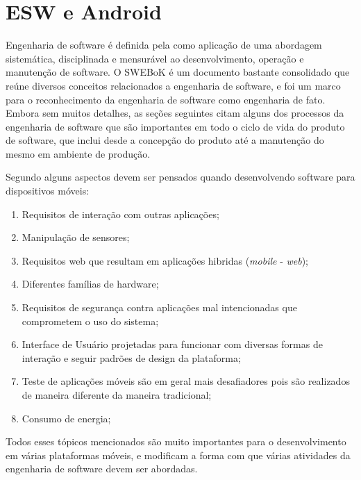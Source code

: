\chapter{ESW e Android}
\label{cap:eswandroid}

Engenharia de software é definida pela \cite{swebok} como aplicação de uma abordagem sistemática, disciplinada e mensurável ao desenvolvimento, operação e manutenção de software. O SWEBoK é um documento bastante consolidado que reúne diversos conceitos relacionados a engenharia de software, e foi um marco para o reconhecimento da engenharia de software como engenharia de fato. Embora sem muitos detalhes, as seções seguintes citam alguns dos processos da engenharia de software que são importantes em todo o ciclo de vida do produto de software, que inclui desde a concepção do produto até a manutenção do mesmo em ambiente de produção.

Segundo  alguns aspectos devem ser pensados quando desenvolvendo software para dispositivos móveis:

\begin{enumerate}
\item Requisitos de interação com outras aplicações;
\item Manipulação de sensores;
\item Requisitos web que resultam em aplicações hibridas (\textit{mobile} - \textit{web});
\item Diferentes famílias de hardware;
\item Requisitos de segurança contra aplicações mal intencionadas que comprometem o uso do sistema;
\item Interface de Usuário projetadas para funcionar com diversas formas de interação e seguir padrões de design da plataforma;
\item Teste de aplicações móveis são em geral mais desafiadores pois são realizados de maneira diferente da maneira tradicional;
\item Consumo de energia;
\end{enumerate}

Todos esses tópicos mencionados são muito importantes para o desenvolvimento em várias plataformas móveis, e modificam a forma com que várias atividades da engenharia de software devem ser abordadas.


